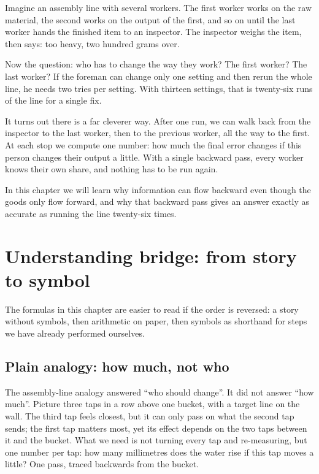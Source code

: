 \begin{untukanak}
Imagine an assembly line with several workers. The first worker works on the raw material, the
second works on the output of the first, and so on until the last worker hands the finished item
to an inspector. The inspector weighs the item, then says: too heavy, two hundred grams over.

Now the question: who has to change the way they work? The first worker? The last worker? If the
foreman can change only one setting and then rerun the whole line, he needs two tries per setting.
With thirteen settings, that is twenty-six runs of the line for a single fix.

It turns out there is a far cleverer way. After one run, we can walk back from the inspector to
the last worker, then to the previous worker, all the way to the first. At each stop we compute
one number: how much the final error changes if this person changes their output a little. With a
single backward pass, every worker knows their own share, and nothing has to be run again.

In this chapter we will learn why information can flow backward even though the goods only flow
forward, and why that backward pass gives an answer exactly as accurate as running the line
twenty-six times.
\end{untukanak}

\section{Understanding bridge: from story to symbol}

The formulas in this chapter are easier to read if the order is reversed: a story without
symbols, then arithmetic on paper, then symbols as shorthand for steps we have already
performed ourselves.

\subsection{Plain analogy: how much, not who}

The assembly-line analogy answered ``who should change''. It did not answer ``how much''.
Picture three taps in a row above one bucket, with a target line on the wall. The third tap
feels closest, but it can only pass on what the second tap sends; the first tap matters
most, yet its effect depends on the two taps between it and the bucket. What we need is not
turning every tap and re-measuring, but one number per tap: how many millimetres does the
water rise if this tap moves a little? One pass, traced backwards from the bucket.

